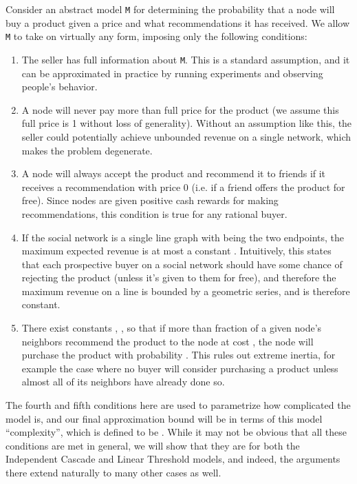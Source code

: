\documentclass[letterpaper,twoside]{article}
\newcommand{\M}{\texttt{M}}
\begin{document}
Consider an abstract model \M{} for determining the probability
that a node will buy a product given a price and what
recommendations it has received. We allow \M{} to take on virtually any
form, imposing only the following conditions:
\begin{enumerate}
    \item The seller has full information about \M. This is a standard assumption, and
    it can be approximated in practice by running experiments and
    observing people's behavior.
    \item A node will never pay more than full price for the product
    (we assume this full price is 1 without loss of generality). Without an
    assumption like this, the seller could potentially achieve
    unbounded revenue on a single network, which makes the
    problem degenerate.
    \item A node will always accept the product and recommend it to
    friends if it receives a recommendation with price 0 (i.e. if a friend
    offers the product for free). Since nodes are given positive cash rewards
    for making recommendations, this condition is true for any rational buyer.
    \item If the social network is a single line graph with  being the
    two endpoints, the maximum expected revenue is at most a constant .
    Intuitively, this states that each prospective buyer on a social network should have
    some chance of rejecting the product (unless it's given to them for free),
    and therefore the maximum revenue on a line is bounded by a geometric series, and
    is therefore constant.
    \item There exist constants , ,  so that if more than
    fraction  of a given node's neighbors recommend the product to the
    node at cost , the node will purchase the product with
    probability . This rules out extreme inertia, for example the case where no buyer will consider
    purchasing a product unless almost all of its neighbors have already done so.
\end{enumerate}
The fourth and fifth conditions here are used to parametrize how complicated
the model is, and our final approximation bound will be in terms of this model
``complexity'', which is defined to be . While it may not
be obvious that all these conditions are met in general, we will show that they
are for both the Independent Cascade and Linear Threshold models, and indeed,
the arguments there extend naturally to many other cases as well.
\end{document}
